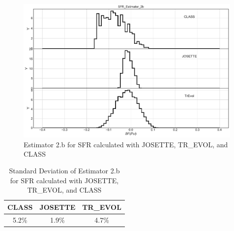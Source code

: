 \begin{figure}[h]
	\begin{center}
		\includegraphics[width = 0.99\textwidth]{../../Feature_1/RAW_DATA/FIG/SFR_Estimator_2b.pdf}
		\caption{Estimator 2.b for \gls{SFR} calculated with JOSETTE, TR\_EVOL, and CLASS}
		\label{fig:Est2_SFR}
	\end{center}
\end{figure}


\begin{table}[h]
	\begin{center}
		\begin{tabular}{|c||c||c|}
			\hline 
				CLASS & JOSETTE & TR\_EVOL \\
			\hline
				5.2\% & 1.9\% & 4.7\% \\
			\hline
		\end{tabular}
	\end{center}
		\caption{Standard Deviation of Estimator 2.b for \gls{SFR} calculated with JOSETTE, TR\_EVOL, and CLASS}
	\label{table:Est2Dev_SFR}
\end{table}

